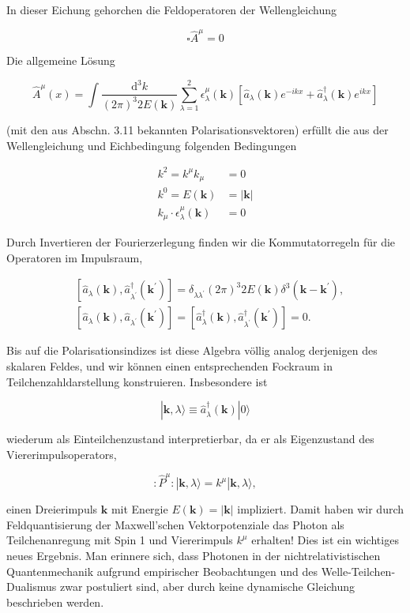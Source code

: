 \documentclass[10pt, letterpaper]{article}
\begin{document}
In dieser Eichung gehorchen die Feldoperatoren der Wellengleichung

$$
\square \hat{A}^{\mu}=0
$$

Die allgemeine Lösung

$$
\hat{A}^{\mu}(x)=\int \frac{\mathrm{d}^{3} k}{(2 \pi)^{3} 2 E(\mathbf{k})} \sum_{\lambda=1}^{2} \epsilon_{\lambda}^{\mu}(\mathbf{k})\left[\hat{a}_{\lambda}(\mathbf{k}) e^{-i k x}+\hat{a}_{\lambda}^{\dagger}(\mathbf{k}) e^{i k x}\right]
$$

(mit den aus Abschn. 3.11 bekannten Polarisationsvektoren) erfüllt die aus der Wellengleichung und Eichbedingung folgenden Bedingungen

$$
\begin{aligned}
k^{2}=k^{\mu} k_{\mu} & =0 \\
k^{0}=E(\mathbf{k}) & =|\mathbf{k}| \\
k_{\mu} \cdot \epsilon_{\lambda}^{\mu}(\mathbf{k}) & =0
\end{aligned}
$$

Durch Invertieren der Fourierzerlegung finden wir die Kommutatorregeln für die Operatoren im Impulsraum,

$$
\begin{aligned}
& {\left[\hat{a}_{\lambda}(\mathbf{k}), \hat{a}_{\lambda^{\prime}}^{\dagger}\left(\mathbf{k}^{\prime}\right)\right]=\delta_{\lambda \lambda^{\prime}}(2 \pi)^{3} 2 E(\mathbf{k}) \delta^{3}\left(\mathbf{k}-\mathbf{k}^{\prime}\right),} \\
& {\left[\hat{a}_{\lambda}(\mathbf{k}), \hat{a}_{\lambda^{\prime}}\left(\mathbf{k}^{\prime}\right)\right]=\left[\hat{a}_{\lambda}^{\dagger}(\mathbf{k}), \hat{a}_{\lambda^{\prime}}^{\dagger}\left(\mathbf{k}^{\prime}\right)\right]=0 .}
\end{aligned}
$$

Bis auf die Polarisationsindizes ist diese Algebra völlig analog derjenigen des skalaren Feldes, und wir können einen entsprechenden Fockraum in Teilchenzahldarstellung konstruieren. Insbesondere ist

$$
|\mathbf{k}, \lambda\rangle \equiv \hat{a}_{\lambda}^{\dagger}(\mathbf{k})|0\rangle
$$

wiederum als Einteilchenzustand interpretierbar, da er als Eigenzustand des Viererimpulsoperators,

$$
: \hat{P}^{\mu}:|\mathbf{k}, \lambda\rangle=k^{\mu}|\mathbf{k}, \lambda\rangle,
$$

einen Dreierimpuls $\mathbf{k}$ mit Energie $E(\mathbf{k})=|\mathbf{k}|$ impliziert. Damit haben wir durch Feldquantisierung der Maxwell'schen Vektorpotenziale das Photon als Teilchenanregung mit Spin 1 und Viererimpuls $k^{\mu}$ erhalten! Dies ist ein wichtiges neues Ergebnis. Man erinnere sich, dass Photonen in der nichtrelativistischen Quantenmechanik aufgrund empirischer Beobachtungen und des Welle-Teilchen-Dualismus zwar postuliert sind, aber durch keine dynamische Gleichung beschrieben werden.
\end{document}
